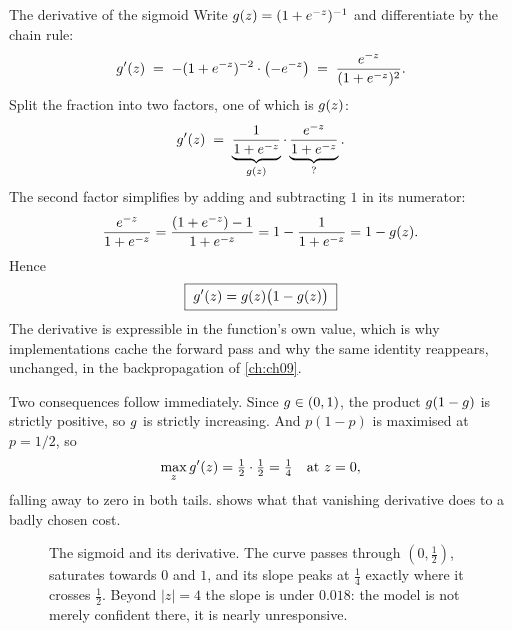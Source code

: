 \begin{derivation}{The derivative of the sigmoid}
Write $g(z) = (1+e^{-z})^{-1}$ and differentiate by the chain rule:
\[
  g'(z) \;=\; -(1+e^{-z})^{-2}\cdot\bigl(-e^{-z}\bigr)
            \;=\; \frac{e^{-z}}{(1+e^{-z})^{2}} .
\]
Split the fraction into two factors, one of which is $g(z)$:
\[
  g'(z) \;=\; \underbrace{\frac{1}{1+e^{-z}}}_{g(z)}
                 \cdot\underbrace{\frac{e^{-z}}{1+e^{-z}}}_{?} .
\]
The second factor simplifies by adding and subtracting $1$ in its numerator:
\[
  \frac{e^{-z}}{1+e^{-z}} = \frac{(1+e^{-z}) - 1}{1+e^{-z}}
    = 1 - \frac{1}{1+e^{-z}} = 1 - g(z).
\]
Hence
\[
  \boxed{\;g'(z) = g(z)\bigl(1-g(z)\bigr)\;}
\]
The derivative is expressible in the function's own value, which is why
implementations cache the forward pass and why the same identity reappears,
unchanged, in the backpropagation of \cref{ch:ch09}.

Two consequences follow immediately. Since $g \in (0,1)$, the product
$g(1-g)$ is strictly positive, so $g$ is strictly increasing. And
$p(1-p)$ is maximised at $p = 1/2$, so
\[
  \max_z g'(z) = \tfrac12\cdot\tfrac12 = \tfrac14 \quad\text{at } z=0,
\]
falling away to zero in both tails.  shows what
that vanishing derivative does to a badly chosen cost.
\end{derivation}

\begin{figure}[htbp]
  \centering
  \caption{The sigmoid and its derivative. The curve passes through
  $(0,\tfrac12)$, saturates towards $0$ and $1$, and its slope peaks at
  $\tfrac14$ exactly where it crosses $\tfrac12$. Beyond $|z| = 4$ the slope is
  under $0.018$: the model is not merely confident there, it is nearly
  unresponsive.}
  \label{fig:sigmoid}
\end{figure}

